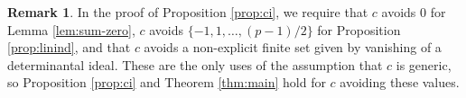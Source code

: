 \documentclass{elsarticle}
\numberwithin{equation}{section}
\theoremstyle{definition}
\newtheorem*{remark}{Remark}
\begin{document}
\begin{remark}
In the proof of Proposition \ref{prop:ci}, we require that $c$ avoids $0$ for Lemma \ref{lem:sum-zero}, $c$ avoids $\{-1, 1,\dots,(p-1)/2\}$ for Proposition \ref{prop:linind}, and that $c$ avoids a non-explicit finite set given by vanishing of a determinantal ideal.  These are the only uses of the assumption that $c$ is generic, so Proposition \ref{prop:ci} and Theorem \ref{thm:main} hold for $c$ avoiding these values.
\end{remark}




\end{document}
